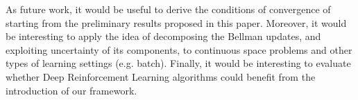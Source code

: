 \documentclass[conference]{IEEEtran}
\begin{document}
As future work, it would be useful to derive the conditions of convergence of \alg starting from the preliminary results proposed in this paper. Moreover, it would be interesting to apply the idea of decomposing the Bellman updates, and exploiting uncertainty of its components, to continuous space problems and other types of learning settings (e.g. batch). Finally, it would be interesting to evaluate whether Deep Reinforcement Learning algorithms could benefit from the introduction of our framework.






\end{document}

